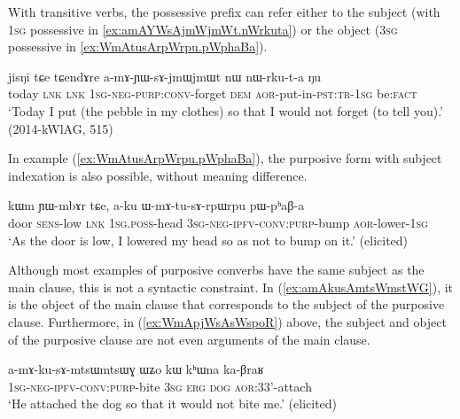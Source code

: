 With transitive verbs, the possessive prefix can refer either to the subject (with \textsc{1sg} possessive  in \ref{ex:amAYWsAjmWjmWt.nWrkuta}) or the object (\textsc{3sg} possessive  in \ref{ex:WmAtusArpWrpu.pWphaBa}).

\begin{exe}
\ex \label{ex:amAYWsAjmWjmWt.nWrkuta}
\gll jisŋi tɕe tɕendɤre a-mɤ-ɲɯ-sɤ-jmɯ\redp{}jmɯt nɯ nɯ-rku-t-a ŋu \\
today \textsc{lnk} \textsc{lnk} \textsc{1sg}-\textsc{neg}-\textsc{purp}:\textsc{conv}-forget \textsc{dem} \textsc{aor}-put-in-\textsc{pst}:\textsc{tr}-\textsc{1sg} be:\textsc{fact} \\
\glt `Today I put (the pebble in my clothes) so that I would not forget (to tell you).' (2014-kWlAG, 515)
\end{exe}

In example (\ref{ex:WmAtusArpWrpu.pWphaBa}), the purposive form  with subject indexation is also possible, without meaning difference.

\begin{exe}
\ex \label{ex:WmAtusArpWrpu.pWphaBa}
\gll kɯm ɲɯ-mbɤr tɕe, a-ku ɯ-mɤ-tu-sɤ-rpɯ\redp{}rpu pɯ-pʰaβ-a \\
door \textsc{sens}-low \textsc{lnk} \textsc{1sg}.\textsc{poss}-head \textsc{3sg}-\textsc{neg}-\textsc{ipfv}-\textsc{conv}:\textsc{purp}-bump \textsc{aor}-lower-\textsc{1sg}\\
\glt `As the door is low, I lowered my head so as not to bump on it.' (elicited)
\end{exe}

Although most examples of purposive converbs have the same subject as the main clause, this is not a syntactic constraint. In (\ref{ex:amAkusAmtsWmstWG}), it is the object of the main clause  that corresponds to the subject of the purposive clause. Furthermore, in (\ref{ex:WmApjWsAsWspoR}) above, the subject and object of the purposive clause are not even arguments of the main clause.

\begin{exe}
\ex \label{ex:amAkusAmtsWmstWG}
\gll  a-mɤ-ku-sɤ-mtsɯ\redp{}mtsɯɣ ɯʑo kɯ kʰɯna ka-βraʁ \\
\textsc{1sg}-\textsc{neg}-\textsc{ipfv}-\textsc{conv}:\textsc{purp}-bite \textsc{3sg} \textsc{erg} \textsc{dog} \textsc{aor}:3\fl{}3'-attach \\
\glt `He attached the dog so that it would not bite me.' (elicited)
\end{exe}

